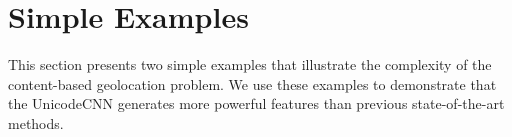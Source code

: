 \documentclass[sigconf,anonymous,review]{acmart}
\begin{document}
\section{Simple Examples}
\label{sec:example}

This section presents two simple examples that illustrate the complexity of the content-based geolocation problem.
We use these examples to demonstrate that the UnicodeCNN generates more powerful features than previous state-of-the-art methods.




\end{document}
